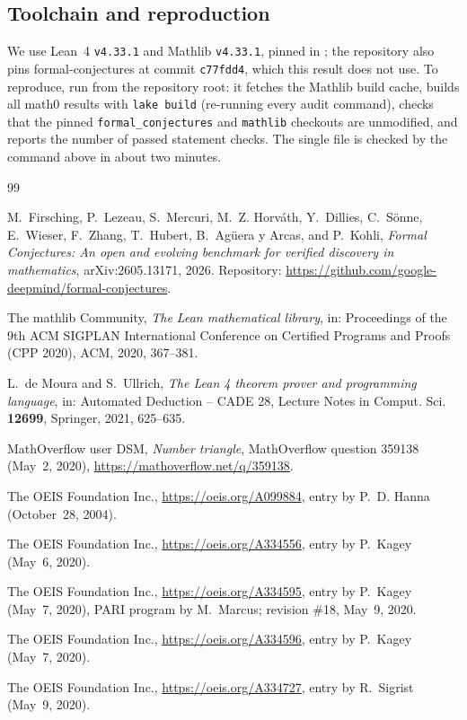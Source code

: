 \documentclass[11pt]{amsart}
\theoremstyle{plain}
\theoremstyle{definition}
\begin{document}
\subsection*{Toolchain and reproduction}
We use Lean~4 \cite{Lean4} \texttt{v4.33.1} and Mathlib \cite{Mathlib} \texttt{v4.33.1}, pinned in ; the repository also pins formal-conjectures \cite{FC} at commit \texttt{c77fdd4}, which this result does not use.
To reproduce, run  from the repository root: it fetches the Mathlib build cache, builds all math0 results with \texttt{lake build} (re-running every audit command), checks that the pinned \texttt{formal\_conjectures} and \texttt{mathlib} checkouts are unmodified, and reports the number of passed statement checks. The single file is checked by the command above in about two minutes.

{\small
\begin{thebibliography}{99}

M.~Firsching, P.~Lezeau, S.~Mercuri, M.~Z. Horv\'ath, Y.~Dillies, C.~S\"onne, E.~Wieser, F.~Zhang, T.~Hubert, B.~Ag\"uera y Arcas, and P.~Kohli, \emph{Formal Conjectures: An open and evolving benchmark for verified discovery in mathematics}, arXiv:2605.13171, 2026. Repository: \url{https://github.com/google-deepmind/formal-conjectures}.

The mathlib Community, \emph{The Lean mathematical library}, in: Proceedings of the 9th ACM SIGPLAN International Conference on Certified Programs and Proofs (CPP 2020), ACM, 2020, 367--381.

L.~de Moura and S.~Ullrich, \emph{The Lean 4 theorem prover and programming language}, in: Automated Deduction -- CADE 28, Lecture Notes in Comput. Sci. \textbf{12699}, Springer, 2021, 625--635.

MathOverflow user DSM, \emph{Number triangle}, MathOverflow question 359138 (May~2, 2020), \url{https://mathoverflow.net/q/359138}.

The OEIS Foundation Inc., \url{https://oeis.org/A099884}, entry by P.~D. Hanna (October~28, 2004).

The OEIS Foundation Inc., \url{https://oeis.org/A334556}, entry by P.~Kagey (May~6, 2020).

The OEIS Foundation Inc., \url{https://oeis.org/A334595}, entry by P.~Kagey (May~7, 2020), PARI program by M.~Marcus; revision \#18, May~9, 2020.

The OEIS Foundation Inc., \url{https://oeis.org/A334596}, entry by P.~Kagey (May~7, 2020).

The OEIS Foundation Inc., \url{https://oeis.org/A334727}, entry by R.~Sigrist (May~9, 2020).

\end{thebibliography}
}
\end{document}
